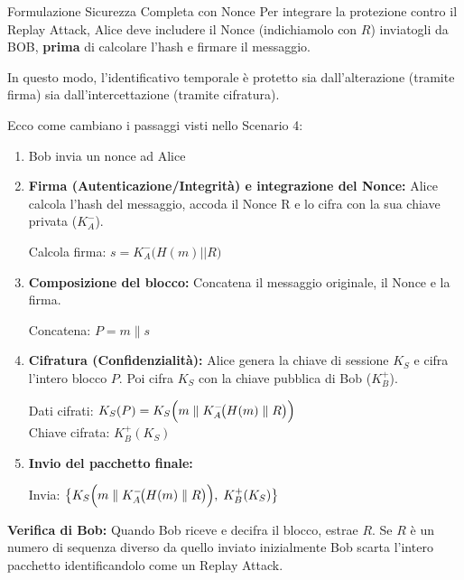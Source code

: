 \documentclass[a4paper,12pt]{report}
\newcommand{\KAm}{K_A^-} %
\newcommand{\KBp}{K_B^+} %
\begin{document}
\newpage
\begin{esempiobox}{Formulazione Sicurezza Completa con Nonce}
Per integrare la protezione contro il Replay Attack, Alice deve includere il Nonce (indichiamolo con $R$) inviatogli da BOB,  \textbf{prima} di calcolare l'hash e firmare il messaggio.

In questo modo, l'identificativo temporale è protetto sia dall'alterazione (tramite firma) sia dall'intercettazione (tramite cifratura).

Ecco come cambiano i passaggi visti nello Scenario 4:

\begin{enumerate}
\item Bob invia un nonce ad Alice
       
    \item \textbf{Firma (Autenticazione/Integrità) e integrazione del Nonce:} Alice calcola l'hash del messaggio, accoda il Nonce R  e lo cifra con la sua chiave privata ($\KAm$).
    \begin{center}
        Calcola firma: $s = \KAm\!\bigl(H(m) || R\bigr)$
    \end{center}
    
    \item \textbf{Composizione del blocco:} Concatena il messaggio originale, il Nonce e la firma.
    \begin{center}
        Concatena: $P = m  \parallel s$
    \end{center}
    
    \item \textbf{Cifratura (Confidenzialità):} Alice genera la chiave di sessione $K_S$ e cifra l'intero blocco $P$. Poi cifra $K_S$ con la chiave pubblica di Bob ($\KBp$).
    \begin{center}
        Dati cifrati: $K_S(P) = K_S\Bigl(m  \parallel \KAm\!\bigl(H(m )\parallel R\bigr)\Bigr)$ \\
        Chiave cifrata: $\KBp(K_S)$
    \end{center}
    
    \item \textbf{Invio del pacchetto finale:}
    \begin{center}
        Invia: $\bigl\{K_S\Bigl(m \parallel \KAm\!\bigl(H(m )\parallel R\bigr)\Bigr),\;\KBp(K_S)\bigr\}$
    \end{center}
\end{enumerate}


\textbf{Verifica di Bob:} Quando Bob riceve e decifra il blocco, estrae $R$. Se $R$ è un numero di sequenza diverso da quello inviato inizialmente Bob scarta l'intero pacchetto identificandolo come un Replay Attack.
\end{esempiobox}
\end{document}

